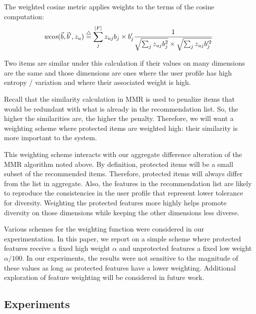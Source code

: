 The weighted cosine metric applies weights to the terms of the cosine computation:
\begin{equation}
    \mathit{wcos}(\vec{b}, \vec{b}', z_u)\buildrel\triangle\over= \sum_{j}^{|F|}{z_{uj} b_j \times b'_j} \frac{1} {\sqrt{\sum_{j} {z_{uj} b^2_j}} \times \sqrt{\sum_{j}{z_{uj} 
    b'^2_j}}}
\end{equation}

Two items are similar under this calculation if their values on many dimensions are the same and those dimensions are ones where the user profile has high entropy / variation and where their associated weight is high. 

Recall that the similarity calculation in MMR is used to penalize items that would be redundant with what is already in the recommendation list. So, the higher the similarities are, the higher the penalty. Therefore, we will want a weighting scheme where protected items are weighted high: their similarity is more important to the system.

This weighting scheme interacts with our aggregate difference alteration of the MMR algorithm noted above. By definition, protected items will be a small subset of the recommended items. Therefore, protected items will always differ from the list in aggregate. Also, the features in the recommendation list are likely to reproduce the consistencies in the user profile that represent lower tolerance for diversity. Weighting the protected features more highly helps promote diversity on those dimensions while keeping the other dimensions less diverse.

Various schemes for the weighting function were considered in our experimentation. In this paper, we report on a simple scheme where protected features receive a fixed high weight $\alpha$ and unprotected features a fixed low weight $\alpha/100$. In our experiments, the results were not sensitive to the magnitude of these values as long as protected features have a lower weighting. Additional exploration of feature weighting will be considered in future work. 


\subsection{\textbf{Experiments}}\label{subsect:ofair_expp}
\label{subsec:ofair_experiemtns}

